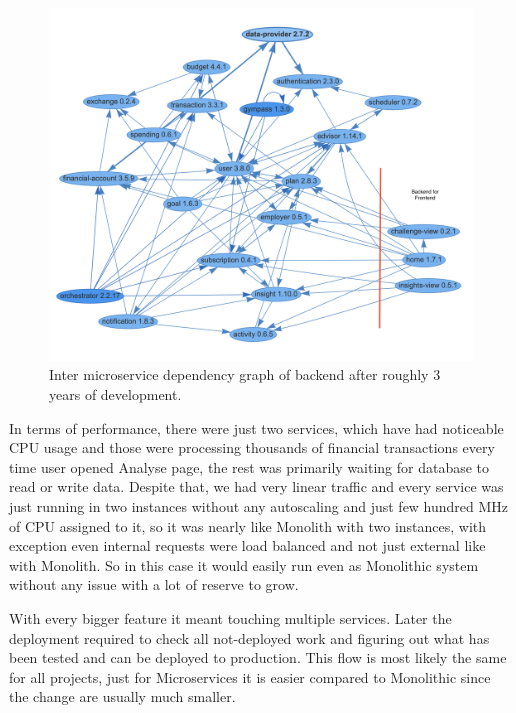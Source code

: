 \begin{figure}
    \centering
    \includegraphics[width=\textwidth]{images/microservices-current-commented.png}
    \caption{Inter microservice dependency graph of backend after roughly 3 years of development. \label{img:microservices-current-commented}}
\end{figure}

In terms of performance, there were just two services, which have had noticeable CPU usage and those were processing thousands of financial transactions every time user opened Analyse page, the rest was primarily waiting for database to read or write data. Despite that, we had very linear traffic and every service was just running in two instances without any autoscaling and just few hundred MHz of CPU assigned to it, so it was nearly like Monolith with two instances, with exception even internal requests were load balanced and not just external like with Monolith. So in this case it would easily run even as Monolithic system without any issue with a lot of reserve to grow.

With every bigger feature it meant touching multiple services. Later the deployment required to check all not-deployed work and figuring out what has been tested and can be deployed to production. This flow is most likely the same for all projects, just for Microservices it is easier compared to Monolithic since the change are usually much smaller.